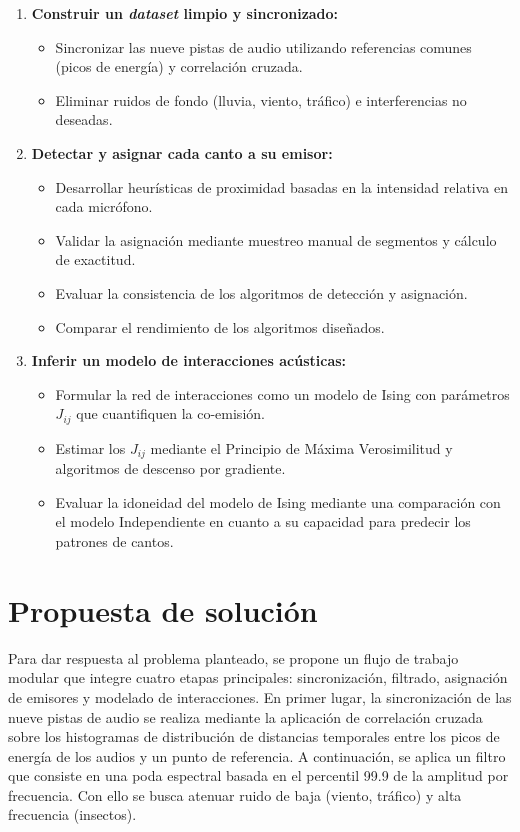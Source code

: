 \begin{enumerate}
  \item \textbf{Construir un \emph{dataset} limpio y sincronizado:}  
    \begin{itemize}
      \item Sincronizar las nueve pistas de audio utilizando referencias comunes (picos de energía) y correlación cruzada.  \cite{costa2021comparing}
      \item Eliminar ruidos de fondo (lluvia, viento, tráfico) e interferencias no deseadas.
    \end{itemize}
  \item \textbf{Detectar y asignar cada canto a su emisor:}  
    \begin{itemize}
      \item Desarrollar heurísticas de proximidad basadas en la intensidad relativa en cada micrófono.  
      \item Validar la asignación mediante muestreo manual de segmentos y cálculo de exactitud.
      \item Evaluar la consistencia de los algoritmos de detección y asignación.
      \item Comparar el rendimiento de los algoritmos diseñados.
    \end{itemize}
  \item \textbf{Inferir un modelo de interacciones acústicas:}  
    \begin{itemize}
      \item Formular la red de interacciones como un modelo de Ising con parámetros \(J_{ij}\) que cuantifiquen la co-emisión.  
      \item Estimar los \(J_{ij}\) mediante el Principio de Máxima Verosimilitud \cite{fisher1912maximum} y algoritmos de descenso por gradiente.
      \item Evaluar la idoneidad del modelo de Ising mediante una comparación con el modelo Independiente en cuanto a su capacidad para predecir los patrones de cantos.
    \end{itemize}
\end{enumerate}


\section{Propuesta de solución}
\label{sec:propuesta_solucion}

Para dar respuesta al problema planteado, se propone un 
flujo de trabajo modular que integre cuatro etapas principales: 
sincronización, filtrado, asignación de 
emisores y modelado de interacciones. En primer lugar, la 
sincronización de las nueve pistas de audio se realiza 
mediante la aplicación de correlación cruzada sobre los histogramas
de distribución de distancias temporales entre los picos de energía de los audios 
y un punto de referencia. A continuación, se 
aplica un filtro que consiste en una poda espectral
basada en el percentil 99.9 de la amplitud por frecuencia.
Con ello se busca atenuar 
ruido de baja (viento, tráfico) y alta frecuencia (insectos).  

